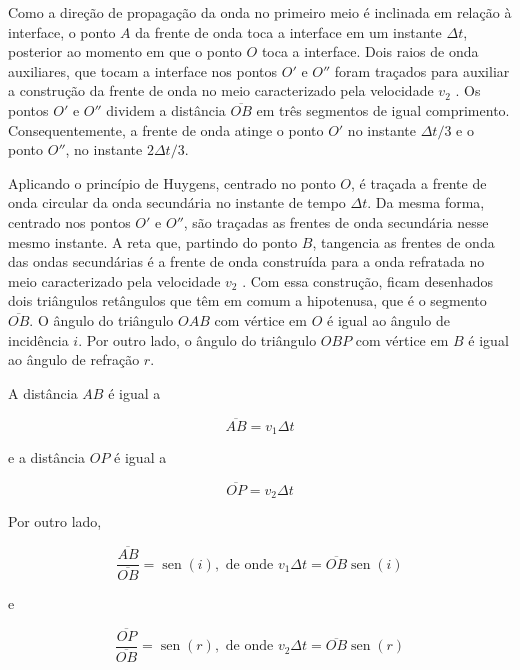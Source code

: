 \documentclass[]{book}
\theoremstyle{definition}
\theoremstyle{definition}
\theoremstyle{definition}
\theoremstyle{remark}
\begin{document}
Como a direção de propagação da onda no primeiro meio é inclinada em relação à interface, o ponto \(A\) da frente de onda toca a interface em um instante \(\Delta t\), posterior ao momento em que o ponto \(O\) toca a interface. Dois raios de onda auxiliares, que tocam a interface nos pontos \(O'\) e \(O''\) foram traçados para auxiliar a construção da frente de onda no meio caracterizado pela velocidade \(v_2\) . Os pontos \(O'\) e \(O''\) dividem a distância \(\overline{OB}\) em três segmentos de igual comprimento. Consequentemente, a frente de onda atinge o ponto \(O'\) no instante \(\Delta t/3\) e o ponto \(O''\), no instante \(2\Delta t/3\).

Aplicando o princípio de Huygens, centrado no ponto \(O\), é traçada a frente de onda circular da onda secundária no instante de tempo \(\Delta t\). Da mesma forma, centrado nos pontos \(O'\) e \(O''\), são traçadas as frentes de onda secundária nesse mesmo instante. A reta que, partindo do ponto \(B\), tangencia as frentes de onda das ondas secundárias é a frente de onda construída para a onda refratada no meio caracterizado pela velocidade \(v_2\) . Com essa construção, ficam desenhados dois triângulos retângulos que têm em comum a hipotenusa, que é o segmento \(\overline{OB}\). O ângulo do triângulo \(OAB\) com vértice em \(O\) é igual ao ângulo de incidência \(i\). Por outro lado, o ângulo do triângulo \(OBP\) com vértice em \(B\) é igual ao ângulo de refração \(r\).

A distância \(AB\) é igual a

\begin{equation}
\overline{A B}=v_{1} \Delta t  \label{eq:0334}
\end{equation}

e a distância \(OP\) é igual a

\begin{equation}
\overline{O P}=v_{2} \Delta t \label{eq:0335}
\end{equation}

Por outro lado,

\begin{equation}
\frac{\overline{A B}}{\overline{O B}}=\operatorname{sen}(i), \text { de onde } v_{1} \Delta t=\overline{O B} \operatorname{sen}(i)  \label{eq:0336}
\end{equation}

e

\begin{equation}
\frac{\overline{O P}}{\overline{O B}}=\operatorname{sen}(r), \text { de onde } v_{2} \Delta t=\overline{O B} \operatorname{sen}(r)  \label{eq:0337}
\end{equation}
\end{document}
